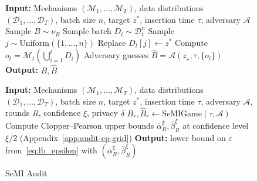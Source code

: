 \documentclass{article}
\theoremstyle{plain}
\theoremstyle{definition}
\theoremstyle{remark}
\newcommand{\cA}{\ensuremath{\mathcal{A}}}
\begin{document}
\setlength{\textfloatsep}{8pt}
\begin{figure}[t!]
    \begin{minipage}[t]{0.54\linewidth}
        \begin{algorithm}[H]
            \caption{SeMI Game}
            \label{alg:crafter}
            \begin{algorithmic}[1]
                \STATE \textbf{Input:} Mechanisms $(\mathcal{M}_1, \ldots, \mathcal{M}_T)$, data distributions $(\mathcal{D}_1, \ldots, \mathcal{D}_T)$, batch size $n$, target $z^*$, insertion time $\tau$, adversary $\cA$
                \STATE Sample $B \sim \nu_{B}$
                \STATE Sample batch $D_t \sim \mathcal{D}_t^n$
                \STATE Sample $j \sim \mathrm{Uniform}(\{1, \ldots, n\})$
                \STATE Replace $D_t[j] \leftarrow z^*$
                \ENDIF
                \STATE Compute $o_t = \mathcal{M}_t\left(\bigcup_{i=1}^t D_i\right)$
                \ENDFOR
                \STATE Adversary guesses $\widehat{B} = \cA(z_\star,\tau,\{o_t\})$
                \STATE \textbf{Output:} $B, \widehat{B}$
            \end{algorithmic}
        \end{algorithm}
    \end{minipage}
    \hfill
    \begin{minipage}[t]{0.42\linewidth}\vspace*{.4em}
        \begin{algorithm}[H]
            \caption{SeMI Audit}
            \label{alg:mi-game}
            \begin{algorithmic}[1]
                \STATE \textbf{Input:} Mechanisms $(\mathcal{M}_1, \ldots, \mathcal{M}_T)$, data distributions $(\mathcal{D}_1, \ldots, \mathcal{D}_T)$, batch size $n$, target $z^*$, insertion time $\tau$, adversary $\cA$, rounds $R$, confidence $\xi$, privacy $\delta$
                \STATE $B_r,\widehat{B}_r \gets \mathrm{SeMIGame}(\tau,\cA)$
                \ENDFOR
                \STATE Compute Clopper--Pearson upper bounds $\overline{\alpha}_R^{\xi}, \overline{\beta}_R^{\xi}$ at confidence level $\xi/2$ (Appendix~\ref{app:audit-cp-grid})
                \STATE \textbf{Output:} lower bound on $\varepsilon$ from~\eqref{eq:lb_epsilon} with $(\overline{\alpha}_R^{\xi},\overline{\beta}_R^{\xi})$
            \end{algorithmic}
        \end{algorithm}
    \end{minipage}
\end{figure}
\end{document}
